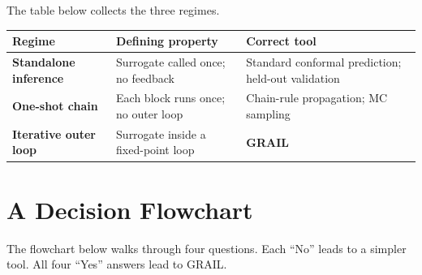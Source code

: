\bigskip

The table below collects the three regimes.

\begin{center}
\small
\begin{tabular}{>{\bfseries}p{} p{} p{}}
\toprule
Regime & Defining property & Correct tool \\
\midrule
Standalone inference
  & Surrogate called once; no feedback
  & Standard conformal prediction; held-out validation \\
One-shot chain
  & Each block runs once; no outer loop
  & Chain-rule propagation; MC sampling \\
Iterative outer loop
  & Surrogate inside a fixed-point loop
  & \textbf{GRAIL} \\
\bottomrule
\end{tabular}
\end{center}

\section{A Decision Flowchart}
\label{sec:flowchart}

The flowchart below walks through four questions.
Each ``No'' leads to a simpler tool.
All four ``Yes'' answers lead to GRAIL.

\bigskip

